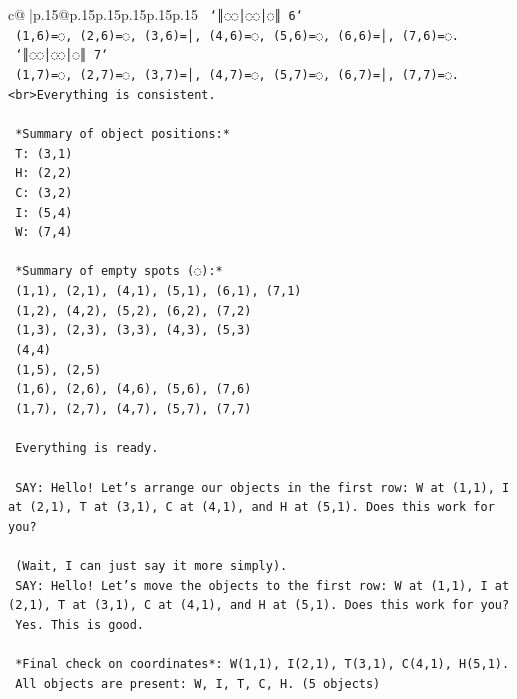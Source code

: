 \documentclass{article}
\begin{document}
{\begin{supertabular}{c@{$\;$}|p{.15\linewidth}@{}p{.15\linewidth}p{.15\linewidth}p{.15\linewidth}p{.15\linewidth}p{.15\linewidth}}
{{{\texttt{    `║◌◌│◌◌│◌║ 6`} \\
\texttt{    (1,6)=◌, (2,6)=◌, (3,6)=│, (4,6)=◌, (5,6)=◌, (6,6)=│, (7,6)=◌.} \\
\texttt{    `║◌◌│◌◌│◌║ 7`} \\
\texttt{    (1,7)=◌, (2,7)=◌, (3,7)=│, (4,7)=◌, (5,7)=◌, (6,7)=│, (7,7)=◌.<br>Everything is consistent.} \\
\\ 
\texttt{    *Summary of object positions:*} \\
\texttt{    T: (3,1)} \\
\texttt{    H: (2,2)} \\
\texttt{    C: (3,2)} \\
\texttt{    I: (5,4)} \\
\texttt{    W: (7,4)} \\
\\ 
\texttt{    *Summary of empty spots (◌):*} \\
\texttt{    (1,1), (2,1), (4,1), (5,1), (6,1), (7,1)} \\
\texttt{    (1,2), (4,2), (5,2), (6,2), (7,2)} \\
\texttt{    (1,3), (2,3), (3,3), (4,3), (5,3)} \\
\texttt{    (4,4)} \\
\texttt{    (1,5), (2,5)} \\
\texttt{    (1,6), (2,6), (4,6), (5,6), (7,6)} \\
\texttt{    (1,7), (2,7), (4,7), (5,7), (7,7)} \\
\\ 
\texttt{    Everything is ready.} \\
\\ 
\texttt{    SAY: Hello! Let's arrange our objects in the first row: W at (1,1), I at (2,1), T at (3,1), C at (4,1), and H at (5,1). Does this work for you?} \\
\\ 
\texttt{    (Wait, I can just say it more simply).} \\
\texttt{    SAY: Hello! Let's move the objects to the first row: W at (1,1), I at (2,1), T at (3,1), C at (4,1), and H at (5,1). Does this work for you?} \\
\texttt{    Yes. This is good.} \\
\\ 
\texttt{    *Final check on coordinates*: W(1,1), I(2,1), T(3,1), C(4,1), H(5,1).} \\
\texttt{    All objects are present: W, I, T, C, H. (5 objects)} \\
}}}
\end{supertabular}}
\end{document}
